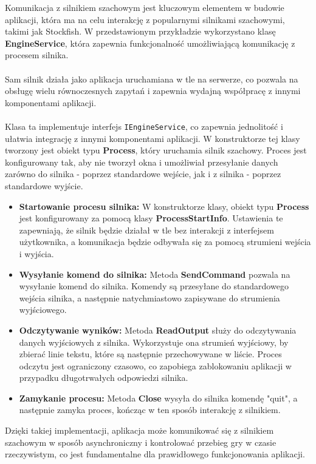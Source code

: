 \documentclass[12pt,a4paper]{article}
\begin{document}
\newpage

\noindent
Komunikacja z silnikiem szachowym jest kluczowym elementem w budowie aplikacji, która ma na celu interakcję z popularnymi silnikami szachowymi, takimi jak Stockfish. W przedstawionym przykładzie wykorzystano klasę \textbf{EngineService}, która zapewnia funkcjonalność umożliwiającą komunikację z procesem silnika.
\\\\
Sam silnik działa jako aplikacja uruchamiana w tle na serwerze, co pozwala na obsługę wielu równoczesnych zapytań i zapewnia wydajną współpracę z innymi komponentami aplikacji.
\\\\
Klasa ta implementuje interfejs \texttt{IEngineService}, co zapewnia jednolitość i ułatwia integrację z innymi komponentami aplikacji. W konstruktorze tej klasy tworzony jest obiekt typu \textbf{Process}, który uruchamia silnik szachowy. Proces jest konfigurowany tak, aby nie tworzył okna i umożliwiał przesyłanie danych zarówno do silnika - poprzez standardowe wejście, jak i z silnika - poprzez standardowe wyjście.

\begin{itemize} 
    \item \textbf{Startowanie procesu silnika:} W konstruktorze klasy, obiekt typu \textbf{Process} jest konfigurowany za pomocą klasy \textbf{ProcessStartInfo}. Ustawienia te zapewniają, że silnik będzie działał w tle bez interakcji z interfejsem użytkownika, a komunikacja będzie odbywała się za pomocą strumieni wejścia i wyjścia. 
    \item \textbf{Wysyłanie komend do silnika:} Metoda \textbf{SendCommand} pozwala na wysyłanie komend do silnika. Komendy są przesyłane do standardowego wejścia silnika, a następnie natychmiastowo zapisywane do strumienia wyjściowego. 
    \item \textbf{Odczytywanie wyników:} Metoda \textbf{ReadOutput} służy do odczytywania danych wyjściowych z silnika. Wykorzystuje ona strumień wyjściowy, by zbierać linie tekstu, które są następnie przechowywane w liście. Proces odczytu jest ograniczony czasowo, co zapobiega zablokowaniu aplikacji w przypadku długotrwałych odpowiedzi silnika. 
    \item \textbf{Zamykanie procesu:} Metoda \textbf{Close} wysyła do silnika komendę "quit", a następnie zamyka proces, kończąc w ten sposób interakcję z silnikiem. 
\end{itemize}

\noindent
Dzięki takiej implementacji, aplikacja może komunikować się z silnikiem szachowym w sposób asynchroniczny i kontrolować przebieg gry w czasie rzeczywistym, co jest fundamentalne dla prawidłowego funkcjonowania aplikacji.
\\\\
\end{document}
